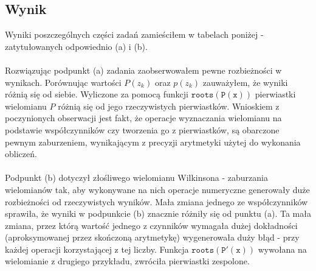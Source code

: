 \subsection{Wynik}
Wyniki poszczególnych części zadań zamieściłem w tabelach poniżej - zatytułowanych odpowiednio (a) i (b). \\\\
Rozwiązując podpunkt (a) zadania zaobserwowałem pewne rozbieżności w wynikach. 
Porównując wartości $ P(z_k) $ oraz $ p(z_k) $ zauważyłem, że wyniki różnią się od siebie. 
Wyliczone za pomocą funkcji $ \mathtt{roots(P(x))} $ pierwiastki wielomianu $ P $ różnią się od jego rzeczywistych pierwiastków. Wnioskiem z poczynionych obserwacji jest fakt, że operacje wyznaczania wielomianu na podstawie współczynników czy tworzenia go z pierwiastków, są obarczone pewnym zaburzeniem, wynikającym z precyzji arytmetyki użytej do wykonania obliczeń. \\\\
Podpunkt (b) dotyczył złośliwego wielomianu Wilkinsona - zaburzania wielomianów tak, aby wykonywane na nich operacje numeryczne generowały duże rozbieżności od rzeczywistych wyników. Mała zmiana jednego ze współczynników sprawiła, że wyniki w podpunkcie (b) znacznie różniły się od punktu (a). Ta mała zmiana, przez którą wartość jednego z czynników wymagała dużej dokładności (aproksymowanej przez skończoną arytmetykę) wygenerowała duży błąd - przy każdej operacji korzystającej z tej liczby. Funkcja $ \mathtt{roots(P'(x))} $ wywołana na wielomianie z drugiego przykładu, zwróciła pierwiastki zespolone.
\newpage
\begin{center}
  
\end{center}